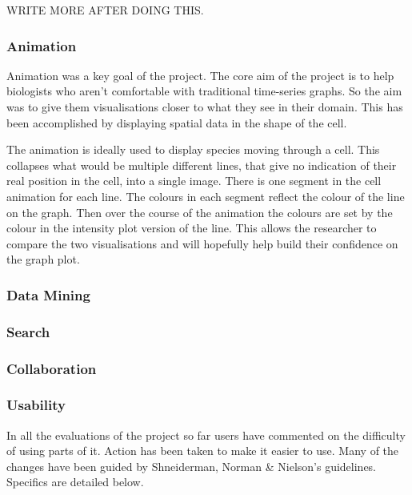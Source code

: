 WRITE MORE AFTER DOING THIS.

\subsubsection{Animation}

Animation was a key goal of the project.  The core aim of the project is to help biologists who aren't comfortable with traditional time-series graphs.  So the aim was to give them visualisations closer to what they see in their domain.  This has been accomplished by displaying spatial data in the shape of the cell.

The animation is ideally used to display species moving through a cell.  This collapses what would be multiple different lines, that give no indication of their real position in the cell, into a single image.  There is one segment in the cell animation for each line.  The colours in each segment reflect the colour of the line on the graph.  Then over the course of the animation the colours are set by the colour in the intensity plot version of the line.  This allows the researcher to compare the two visualisations and will hopefully help build their confidence on the graph plot.

\subsubsection{Data Mining}

\subsubsection{Search}

\subsubsection{Collaboration}



\subsubsection{Usability}

In all the evaluations of the project so far users have commented on the difficulty of using parts of it.  Action has been taken to make it easier to use.  Many of the changes have been guided by Shneiderman, Norman \& Nielson's guidelines.  Specifics are detailed below.

